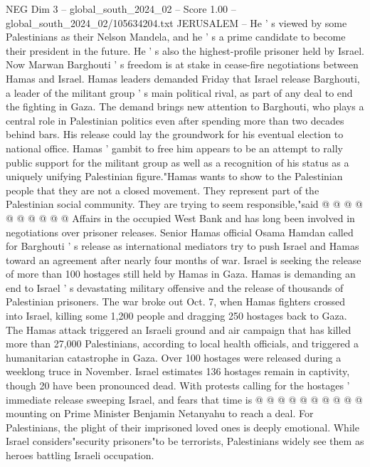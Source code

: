 \begin{textsample}{NEG Dim 3 – global\_south\_2024\_02 – Score 1.00 – global\_south\_2024\_02/105634204.txt}  \label{ex:f3_neg_098}
JERUSALEM -- He ' s viewed by some Palestinians as their Nelson Mandela, and he ' s a prime candidate to become their president in the future.
He ' s also the highest-profile prisoner held by Israel.
Now Marwan Barghouti ' s freedom is at stake in cease-fire negotiations between Hamas and Israel.
Hamas leaders demanded Friday that Israel release Barghouti, a leader of the militant group ' s main political rival, as part of any deal to end the fighting in Gaza.
The demand brings new attention to Barghouti, who plays a central role in Palestinian politics even after spending more than two decades behind bars.
His release could lay the groundwork for his eventual election to national office.
Hamas ' gambit to free him appears to be an attempt to rally public support for the militant group as well as a recognition of his status as a uniquely unifying Palestinian figure."Hamas wants to show to the Palestinian people that they are not a closed movement.
They represent part of the Palestinian social community.
They are trying to seem responsible,"said @ @ @ @ @ @ @ @ @ @ Affairs in the occupied West Bank and has long been involved in negotiations over prisoner releases.
Senior Hamas official Osama Hamdan called for Barghouti ' s release as international mediators try to push Israel and Hamas toward an agreement after nearly four months of war.
Israel is seeking the release of more than 100 hostages still held by Hamas in Gaza.
Hamas is demanding an end to Israel ' s devastating military offensive and the release of thousands of Palestinian prisoners.
The war broke out Oct. 7, when Hamas fighters crossed into Israel, killing some 1,200 people and dragging 250 hostages back to Gaza.
The Hamas attack triggered an Israeli ground and air campaign that has killed more than 27,000 Palestinians, according to local health officials, and triggered a humanitarian catastrophe in Gaza.
Over 100 hostages were released during a weeklong truce in November.
Israel estimates 136 hostages remain in captivity, though 20 have been pronounced dead.
With protests calling for the hostages ' immediate release sweeping Israel, and fears that time is @ @ @ @ @ @ @ @ @ @ mounting on Prime Minister Benjamin Netanyahu to reach a deal.
For Palestinians, the plight of their imprisoned loved ones is deeply emotional.
While Israel considers"security prisoners"to be terrorists, Palestinians widely see them as heroes battling Israeli occupation.

\end{textsample}
